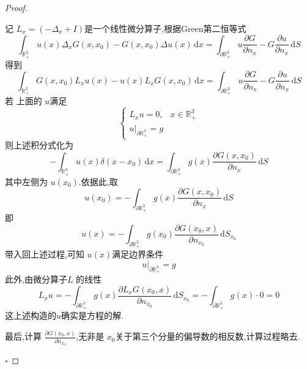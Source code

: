 \documentclass[../../main.tex]{subfiles}
\begin{document}
\begin{proof}
\begin{enumerate}
   记 \(  L_{x}= \left( - \Delta _{x}+ I \right)   \)是一个线性微分算子,根据Green第二恒等式 \[
   \int_{\mathbb{R} _{+ }^{3}}u\left( x \right) \Delta _{x}G\left( x,x_0 \right)-G\left( x,x_0 \right) \Delta u\left( x \right)\,\mathrm{d} x= \int_{ \partial \mathbb{R} _{+ }^{3}}u\frac{\partial G}{\partial n_{x}}    -G\frac{\partial u}{\partial n_{x}} \,\mathrm{d} S
   \] 得到 \[
   \int_{\mathbb{R} _{+ }^{3}}G\left( x,x_0 \right)L_{x}  u\left( x \right)- u\left( x \right)L_{x}G\left( x,x_0 \right)  \,\mathrm{d} x= \int_{ \partial \mathbb{R} _{+ }^{3}} u\frac{\partial G}{\partial n_{x}}-G\frac{\partial u}{\partial n_{x}}\,\mathrm{d} S
   \]若 上面的 \(  u  \)满足 \[
   \begin{cases} L_{x}u= 0,&x\in \mathbb{R} _{+ }^{3}\\ 
    u|_{ \partial \mathbb{R} _{+ }^{3}}= g \end{cases} 
   \]  则上述积分式化为 \[
   -\int_{\mathbb{R} _{+ }^{3}}u\left( x \right) \delta \left( x-x_0 \right)\,\mathrm{d} x=  \int_{ \partial \mathbb{R} _{+ }^{3}}g\left( x \right)\frac{\partial G\left( x,x_0 \right) }{\partial n_{x}}\,\mathrm{d} S   
   \]其中左侧为 \(  u\left( x_0 \right)   \).依据此,取 \[
   u\left( x_0 \right)= -\int_{ \partial \mathbb{R} _{+ }^{3}}g\left( x \right)\frac{\partial G\left( x,x_0 \right) }{\partial n_{x}}\,\mathrm{d} S  
   \] 即 \[
   u\left( x \right)= -\int_{ \partial \mathbb{R} _{+ }^{3}} g\left( x_0 \right)\frac{\partial G\left( x_0,x \right) }{\partial n_{x_0}}\,\mathrm{d} S_{x_0} 
   \]带入回上述过程,可知 \(  u\left( x \right)   \)满足边界条件 \[
   u|_{ \partial \mathbb{R} _{+ }^{3}}= g
   \]此外,由微分算子\(  L  \) 的线性 \[
   L_{x}u= -\int_{ \partial \mathbb{R} _{+ }^{3}} g\left( x \right) \frac{\partial L_{x}G\left( x_0,x \right) }{\partial n_{x_0} }\,\mathrm{d} S_{x_0}= -\int_{ \partial \mathbb{R} _{+ }^{3}}g\left( x \right)\cdot 0= 0  
   \] 这上述构造的\(  u  \)确实是方程的解.
   
   最后,计算 \(  \frac{\partial G\left( x_0,x \right) }{\partial n_{x_0}}\),无非是 \(  x_0  \)关于第三个分量的偏导数的相反数,计算过程略去. 
 \end{enumerate}
 

    \hfill $\square$
\end{proof}
\end{document}
